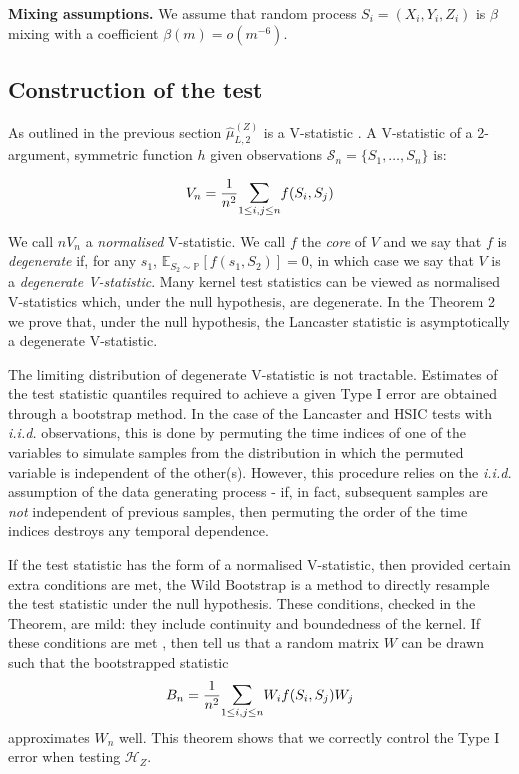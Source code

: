 \documentclass[]{article}
\begin{document}
\textbf{Mixing assumptions.} We assume that random process   $S_i = (X_i,Y_i,Z_i)$ is $\beta$ mixing with a coefficient   $\beta(m)  = o(m^{-6})$. 





\subsection{Construction of the test}
As outlined in the previous section  $\hat \mu^{(Z)}_{L,2}$ is a V-statistic \cite{serfling2009approximation}. A V-statistic   of a 2-argument, symmetric function $h$ given  observations $\mathcal{S}_n = \{S_1,\ldots,S_n\}$  is:

\[ V_n =  \frac{1}{n^2} \mathlarger{\sum}_{1\leq i,j \leq n} f(S_i,S_j)\]


We call $nV_n$ a \emph{normalised} V-statistic. We call $f$ the \emph{core} of $V$ and we say that $f$ is \emph{degenerate} if, for any $s_1$, $\mathbb{E}_{S_2 \sim \mathbb{P}}[f(s_1,S_2)] = 0$, in which case we say that $V$ is a \emph{degenerate V-statistic}. Many kernel test statistics can be viewed as normalised V-statistics which, under the null hypothesis, are degenerate. In the Theorem 2 we prove that, under the null hypothesis, the Lancaster statistic is asymptotically a degenerate V-statistic. 

The limiting distribution of degenerate V-statistic is not tractable.   Estimates of the test statistic quantiles  required to achieve a given Type I error are obtained through a bootstrap  method. In the case of the Lancaster and HSIC tests with \emph{i.i.d.} observations, this is done by permuting the time indices of one of the variables to simulate samples from the distribution in which the permuted variable is independent of the other(s). However, this procedure relies on the \emph{i.i.d.} assumption of the data generating process - if, in fact, subsequent samples are \emph{not} independent of previous samples, then permuting the order of the time indices destroys any temporal dependence. 

If the test statistic has the form of a normalised V-statistic, then provided certain extra conditions are met, the Wild Bootstrap \cite{leucht2013dependent} is a method to directly resample the test statistic under the null hypothesis. These conditions, checked in the Theorem, are mild: they include continuity and boundedness of the kernel. If these conditions are met , then \cite{leucht2013dependent} tell us that a random matrix $W$ can be drawn such that the bootstrapped statistic 
\[
B_n = \frac{1}{n^2} \mathlarger{\sum}_{1\leq i,j \leq n} W_{i}f(S_i,S_j)W_{j} 
\]
approximates $W_n$ well. This theorem shows that we correctly control the Type I error when testing $\mathcal{H}_Z$.
\end{document}
